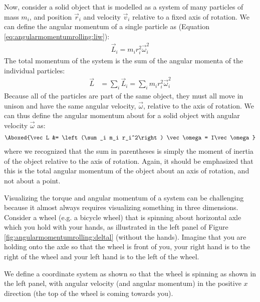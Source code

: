 Now, consider a solid object that is modelled as a system of many particles of mass $m_i$, and position $\vec r_i$ and velocity $\vec v_i$ relative to a fixed axis of rotation. We can define the angular momentum of a single particle as (Equation \ref{eq:angularmomentumrolling:liw}):
\begin{align*}
\vec L_i = m_i r_i^2 \vec \omega_i^2
\end{align*}
The total momentum of the system is the sum of the angular momenta of the individual particles:
\begin{align*}
\vec L &= \sum_i\vec L_i = \sum_i  m_i r_i^2 \vec \omega_i^2
\end{align*}
Because all of the particles are part of the same object, they must all move in unison and have the same angular velocity, $\vec\omega$, relative to the axis of rotation. We can thus define the angular momentum about for a solid object with angular velocity $\vec\omega$ as:
\begin{align}
\Aboxed{\vec L &= \left(\sum_i  m_i r_i^2\right) \vec \omega = I\vec\omega}
\end{align}
where we recognized that the sum in parentheses is simply the moment of inertia of the object relative to the axis of rotation. Again, it should be emphasized that this is the total angular momentum of the object about an axis of rotation, and not about a point. 

Visualizing the torque and angular momentum of a system can be challenging because it almost always requires visualizing something in three dimensions. Consider a wheel (e.g. a bicycle wheel) that is spinning about horizontal axle which you hold with your hands, as illustrated in the left panel of Figure \ref{fig:angularmomentumrolling:deltal} (without the hands). Imagine that you are holding onto the axle so that the wheel is front of you, your right hand is to the right of the wheel and your left hand is to the left of the wheel.

We define a coordinate system as shown so that the wheel is spinning as shown in the left panel, with angular velocity (and angular momentum) in the positive $x$ direction (the top of the wheel is coming towards you).

